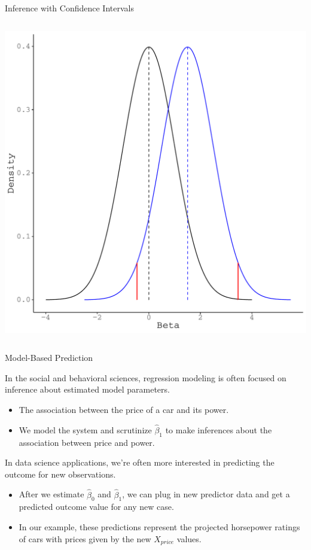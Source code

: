 \documentclass[10pt]{beamer}\usepackage[]{graphicx}\usepackage[]{color}
\makeatletter
\def\maxwidth{ %
  \ifdim\Gin@nat@width>\linewidth
    \linewidth
  \else
    \Gin@nat@width
  \fi
}
\newenvironment{knitrout}{}{} %
\makeatother
\begin{document}
\begin{frame}{Inference with Confidence Intervals}
\begin{columns}
\begin{column}{0.5\textwidth}
\begin{knitrout}
{\centering \includegraphics[width=\maxwidth]{figure/unnamed-chunk-23-1} 

}


\end{knitrout}

\end{column}
\end{columns}

\end{frame}


\begin{frame}{Model-Based Prediction}

  In the social and behavioral sciences, regression modeling is often focused on
  inference about estimated model parameters.
  \vc
  \begin{itemize}
  \item The association between the price of a car and its power.
    \vc
  \item We model the system and scrutinize $\hat{\beta}_1$ to make inferences
    about the association between price and power.
  \end{itemize}
  \vb
  \pause
  In data science applications, we're often more interested in predicting the
  outcome for new observations.
  \vc
  \begin{itemize}
  \item After we estimate $\hat{\beta}_0$ and $\hat{\beta}_1$, we can plug in
    new predictor data and get a predicted outcome value for any new case.
  \vc
  \item In our example, these predictions represent the projected horsepower
    ratings of cars with prices given by the new $X_{price}$ values.
  \end{itemize}

\end{frame}
\end{document}
